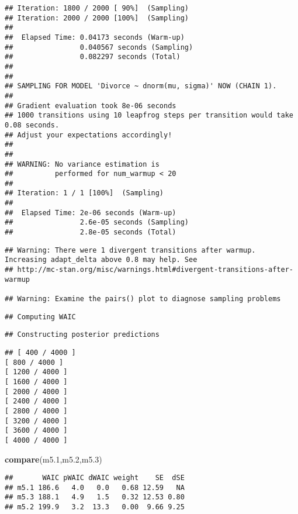 \documentclass[]{article}
\newenvironment{Shaded}{\begin{snugshade}}{\end{snugshade}}
\newcommand{\KeywordTok}[1]{\textcolor[rgb]{0.13,0.29,0.53}{\textbf{#1}}}
\newcommand{\DecValTok}[1]{\textcolor[rgb]{0.00,0.00,0.81}{#1}}
\newcommand{\NormalTok}[1]{#1}
\begin{document}
\begin{verbatim}
## Iteration: 1800 / 2000 [ 90%]  (Sampling)
## Iteration: 2000 / 2000 [100%]  (Sampling)
## 
##  Elapsed Time: 0.04173 seconds (Warm-up)
##                0.040567 seconds (Sampling)
##                0.082297 seconds (Total)
## 
## 
## SAMPLING FOR MODEL 'Divorce ~ dnorm(mu, sigma)' NOW (CHAIN 1).
## 
## Gradient evaluation took 8e-06 seconds
## 1000 transitions using 10 leapfrog steps per transition would take 0.08 seconds.
## Adjust your expectations accordingly!
## 
## 
## WARNING: No variance estimation is
##          performed for num_warmup < 20
## 
## Iteration: 1 / 1 [100%]  (Sampling)
## 
##  Elapsed Time: 2e-06 seconds (Warm-up)
##                2.6e-05 seconds (Sampling)
##                2.8e-05 seconds (Total)
\end{verbatim}

\begin{verbatim}
## Warning: There were 1 divergent transitions after warmup. Increasing adapt_delta above 0.8 may help. See
## http://mc-stan.org/misc/warnings.html#divergent-transitions-after-warmup

## Warning: Examine the pairs() plot to diagnose sampling problems
\end{verbatim}

\begin{verbatim}
## Computing WAIC
\end{verbatim}

\begin{verbatim}
## Constructing posterior predictions
\end{verbatim}

\begin{verbatim}
## [ 400 / 4000 ]
[ 800 / 4000 ]
[ 1200 / 4000 ]
[ 1600 / 4000 ]
[ 2000 / 4000 ]
[ 2400 / 4000 ]
[ 2800 / 4000 ]
[ 3200 / 4000 ]
[ 3600 / 4000 ]
[ 4000 / 4000 ]
\end{verbatim}

\begin{Shaded}
\begin{Highlighting}[]
\KeywordTok{compare}\NormalTok{(m5.}\DecValTok{1}\NormalTok{,m5.}\DecValTok{2}\NormalTok{,m5.}\DecValTok{3}\NormalTok{)}
\end{Highlighting}
\end{Shaded}

\begin{verbatim}
##       WAIC pWAIC dWAIC weight    SE  dSE
## m5.1 186.6   4.0   0.0   0.68 12.59   NA
## m5.3 188.1   4.9   1.5   0.32 12.53 0.80
## m5.2 199.9   3.2  13.3   0.00  9.66 9.25
\end{verbatim}
\end{document}
